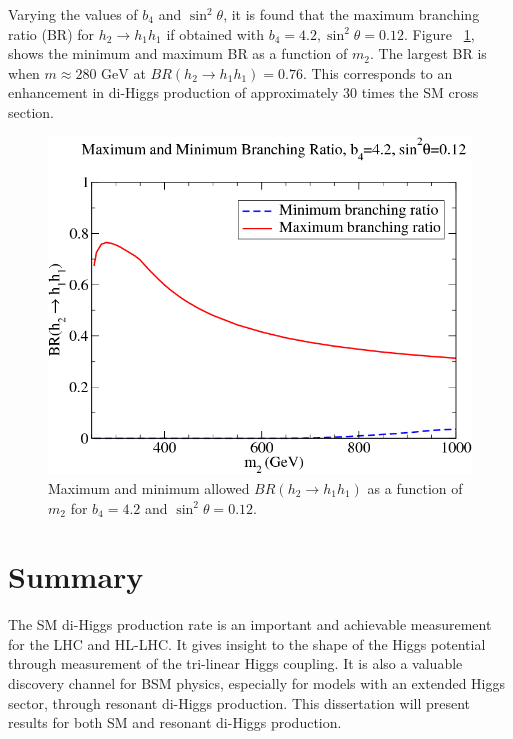\indent Varying the values of ${b_{4}}$ and ${\sin^{2}{\theta}}$, it is found that the maximum branching ratio (BR) for ${h_{2}\rightarrow h_{1}h_{1}}$ if obtained with ${b_{4} = 4.2, \sin^{2}\theta = 0.12}$. Figure ~\ref{fig:Ian6}, shows the minimum and maximum BR as a function of ${m_{2}}$. The largest BR is when ${m \approx 280 \text{ GeV}}$ at ${BR(h_{2}\rightarrow h_{1}h_{1}) = 0.76}$. This corresponds to an enhancement in di-Higgs production of approximately 30 times the SM cross section.

\begin{figure}[h]
\begin{center}
\includegraphics[scale=0.6]{figures/Ian6}
\caption[Allowed branching ratios for resonant di-Higgs production]{Maximum and minimum allowed ${BR(h_{2}\rightarrow h_{1}h_{1})}$ as a function of ${m_{2}}$ for ${b_{4} = 4.2}$ and ${\sin^{2}{\theta} = 0.12}$.}
\label{fig:Ian6}
\end{center}
\end{figure}

\section{Summary}
The SM di-Higgs production rate is an important and achievable measurement for the LHC and HL-LHC. It gives insight to the shape of the Higgs potential through measurement of the tri-linear Higgs coupling. It is also a valuable discovery channel for BSM physics, especially for models with an extended Higgs sector, through resonant di-Higgs production. This dissertation will present results for both SM and resonant di-Higgs production.
